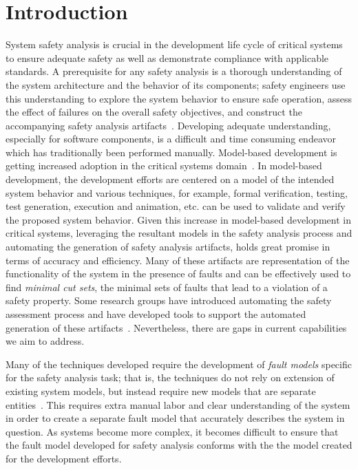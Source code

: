 \chapter{Introduction}
\label{chap:intro}

System safety analysis is crucial in the development life cycle of critical systems to ensure adequate safety as well as demonstrate compliance with applicable standards. A prerequisite for any safety analysis is a thorough understanding of the system architecture and the behavior of its components; safety engineers use this understanding to explore the system behavior to ensure safe operation, assess the effect of failures on the overall safety objectives, and construct the accompanying safety analysis artifacts~\cite{SAE:ARP4761,SAE:ARP4754A}. Developing adequate understanding, especially for software components, is a difficult and time consuming endeavor which has traditionally been performed manually. Model-based development is getting increased adoption in the critical systems domain~\cite{Joshi05:Dasc,CAV2015:BoCiGrMa,info17:HaLuHo,5979344,Gudemann:2010:FQQ:1909626.1909813}. In model-based development, the development efforts are centered on a model of the intended system behavior and various techniques, for example, formal verification, testing, test generation, execution and animation, etc. can be used to validate and verify the proposed system behavior. Given this increase in model-based development in critical systems, leveraging the resultant models in the safety analysis process and automating the generation of safety analysis artifacts, holds great promise in terms of accuracy and efficiency. Many of these artifacts are representation of the functionality of the system in the presence of faults and can be effectively used to find \textit{minimal cut sets}, the minimal sets of faults that lead to a violation of a safety property. Some research groups have introduced automating the safety assessment process and have developed tools to support the automated generation of these artifacts~\cite{Joshi05:SafeComp,CAV2015:BoCiGrMa,10.1007/978-3-319-11936-6-7}. Nevertheless, there are gaps in current capabilities we aim to address. 

Many of the techniques developed require the development of {\em fault models} specific for the safety analysis task; that is, the techniques do not rely on extension of existing system models, but instead require new models that are separate entities~\cite{symbAltaRica, DBLP:conf/tacas/BittnerBCCGGMMZ16, info8010007, Gudemann:2010:FQQ:1909626.1909813}. This requires extra manual labor and clear understanding of the system in order to create a separate fault model that accurately describes the system in question. As systems become more complex, it becomes difficult to ensure that the fault model developed for safety analysis conforms with the the model created for the development efforts. 

